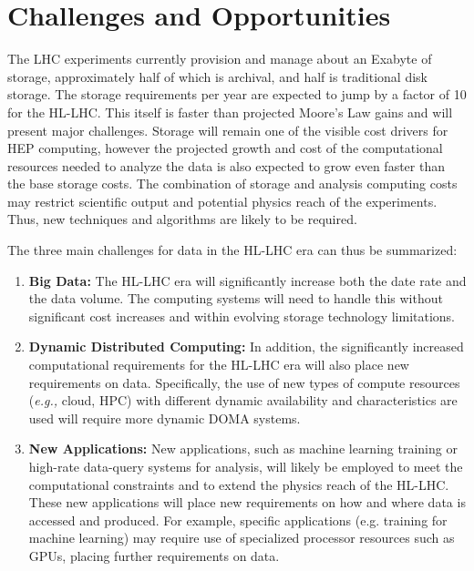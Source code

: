 \documentclass[12pt,a4paper]{article}
\begin{document}
\section{Challenges and
Opportunities}\label{challenges-and-opportunities}

The LHC experiments currently provision and manage about an Exabyte of
storage, approximately half of which is archival, and half is
traditional disk storage. The storage requirements per year are expected
to jump by a factor of 10 for the HL-LHC. This itself is faster than
projected Moore's Law gains and will present major challenges. Storage
will remain one of the visible cost drivers for HEP computing, however
the projected growth and cost of the computational resources needed to
analyze the data is also expected to grow even faster than the base
storage costs. The combination of storage and analysis computing costs
may restrict scientific output and potential physics reach of the
experiments. Thus, new techniques and algorithms are likely to be
required.

The three main challenges for data in the HL-LHC era can thus be
summarized:

\begin{enumerate}
\def\labelenumi{\arabic{enumi}.}
\item \textbf{Big Data:} The HL-LHC era will significantly increase both the
  date rate and the data volume. The computing systems will need to
  handle this without significant cost increases and within evolving
  storage technology limitations.
\item \textbf{Dynamic Distributed Computing:} In addition, the significantly
  increased computational requirements for the HL-LHC era will also
  place new requirements on data. Specifically, the use of new types of
  compute resources (\emph{e.g.,} cloud, HPC) with different dynamic
  availability and characteristics are used will require more dynamic
  DOMA systems.
\item \textbf{New Applications:} New applications, such as machine learning
  training or high-rate data-query systems for analysis, will likely be
  employed to meet the computational constraints and to extend the
  physics reach of the HL-LHC. These new applications will place new
  requirements on how and where data is accessed and produced. For
  example, specific applications (e.g. training for machine learning)
  may require use of specialized processor resources such as GPUs,
  placing further requirements on data.
\end{enumerate}
\end{document}
